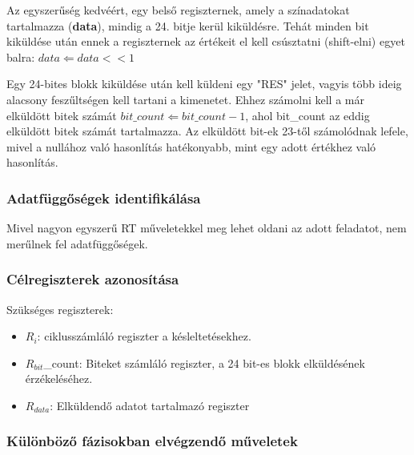 \documentclass[10pt]{article} %
\begin{document}
\indent Az egyszerűség kedvéért, egy belső regiszternek, amely a színadatokat tartalmazza (\textbf{data}), mindig a 24. bitje kerül kiküldésre.
Tehát minden bit kiküldése után ennek a regiszternek az értékeit el kell csúsztatni (shift-elni) egyet balra: $data \Leftarrow data << 1$

\indent Egy 24-bites blokk kiküldése után kell küldeni egy "RES" jelet, vagyis több ideig alacsony feszűltségen kell tartani a kimenetet. 
Ehhez számolni kell a már elküldött bitek számát $bit\_count \Leftarrow bit\_count - 1$, ahol bit\_count az eddig elküldött bitek számát tartalmazza.
Az elküldött bit-ek 23-től számolódnak lefele, mivel a nullához való hasonlítás hatékonyabb, mint egy adott értékhez való hasonlítás.

\subsubsection{Adatfüggőségek identifikálása}

Mivel nagyon egyszerű RT műveletekkel meg lehet oldani az adott feladatot, nem merűlnek fel adatfüggőségek.

\subsubsection{Célregiszterek azonosítása}

Szükséges regiszterek:
\begin{itemize}
	\item $R_i$: ciklusszámláló regiszter a késleltetésekhez.
	\item $R_{bit}$\_count: Biteket számláló regiszter, a 24 bit-es blokk elküldésének érzékeléséhez.
	\item $R_{data}$: Elküldendő adatot tartalmazó regiszter
\end{itemize}

\subsubsection{Különböző fázisokban elvégzendő műveletek}
\end{document}
